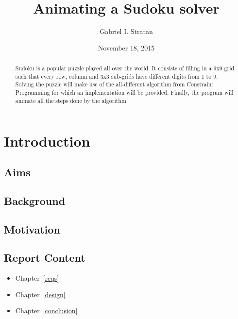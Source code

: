\documentclass{l4proj}
\begin{document}
\title{Animating a Sudoku solver}
\author{Gabriel I. Stratan}
\date{November 18, 2015}
\maketitle

\begin{abstract}
Sudoku is a popular puzzle played all over the world. It consists of filling in a 9x9 grid such that every row, column and 3x3 sub-grids have different digits from 1 to 9. Solving the puzzle will make use of the all-different algorithm from Constraint Programming for which an implementation will be provided. Finally, the program will animate all the steps done by the algorithm.
\end{abstract}

\educationalconsent
%
%
\chapter{Introduction}
\label{intro}

\section{Aims}


\section{Background} 

\section{Motivation} 

\section{Report Content}

\begin{itemize}
\item Chapter~\ref{reqs}
\item Chapter~\ref{design}
\item Chapter~\ref{conclusion}
\end{itemize}

\end{document}
